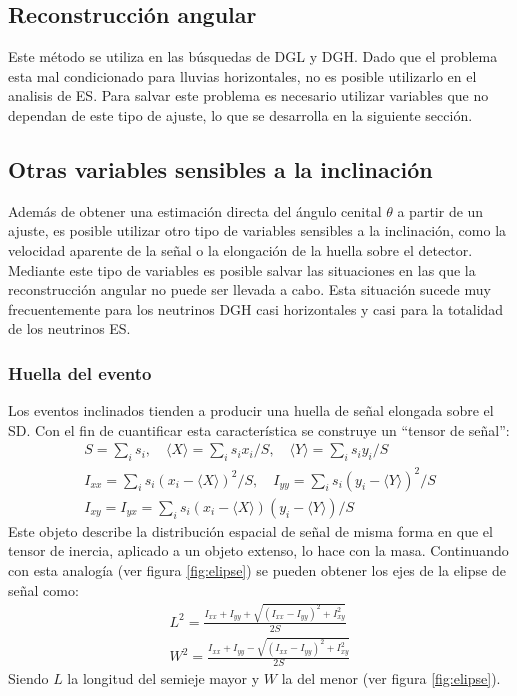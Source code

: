 	
	
	\subsection{Reconstrucción angular}
	\label{sbsc:thetaRec}
	
	
	Este método se utiliza en las búsquedas de DGL y DGH.
	Dado que el problema esta mal condicionado para lluvias horizontales, no es posible utilizarlo en el analisis de ES.
	Para salvar este problema es necesario utilizar variables que no dependan de este tipo de ajuste, lo que se desarrolla en la siguiente sección.
	
	\subsection{Otras variables sensibles a la inclinación}
	
	Además de obtener una estimación directa del ángulo cenital $\theta$ a partir de un ajuste, es posible utilizar otro tipo de variables sensibles a la inclinación, como la velocidad aparente de la señal o la elongación de la huella sobre el detector.
	Mediante este tipo de variables es posible salvar las situaciones en las que la reconstrucción angular no puede ser llevada a cabo.
	Esta situación sucede muy frecuentemente para los neutrinos DGH casi horizontales y casi para la totalidad de los neutrinos ES.
	
		\subsubsection{Huella del evento}
		Los eventos inclinados tienden a producir una huella de señal elongada sobre el SD.
		Con el fin de cuantificar esta característica se construye un ``tensor de señal'':
		\begin{eqnarray}
		S = \sum_i s_i, \quad \langle X \rangle = \sum_i s_i x_i/S, \quad \langle Y \rangle = \sum_i s_i y_i/S \nonumber \\
		I_{xx} = \sum_i s_i (x_i - \langle X \rangle)^2 / S, \quad I_{yy} = \sum_i s_i (y_i - \langle Y \rangle)^2 / S \nonumber \\
		I_{xy} = I_{yx} = \sum_i s_i (x_i - \langle X \rangle)(y_i - \langle Y \rangle) / S 
		\end{eqnarray}
		Este objeto describe la distribución espacial de señal de misma forma en que el tensor de inercia, aplicado a un objeto extenso, lo hace con la masa.
		Continuando con esta analogía (ver figura \ref{fig:elipse}) se pueden obtener los ejes de la elipse de señal como:
		\begin{eqnarray}
		L^2 =\frac{I_{xx}+I_{yy}+\sqrt{(I_{xx}-I_{yy})^2 + I_{xy}^2 }}{2S} \nonumber\\
		W^2 =\frac{I_{xx}+I_{yy}-\sqrt{(I_{xx}-I_{yy})^2 + I_{xy}^2 }}{2S} 
		\end{eqnarray}
		Siendo $L$ la longitud del semieje mayor y $W$ la del menor (ver figura \ref{fig:elipse}).

